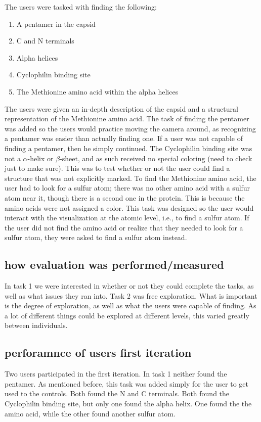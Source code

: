 \documentclass[review,journal]{vgtc}         %
\begin{document}
The users were tasked with finding the following:

\begin{enumerate}
	\item A pentamer in the capsid
	\item C and N terminals
	\item Alpha helices
	\item Cyclophilin binding site
	\item The Methionine amino acid within the alpha helices 
\end{enumerate}

The users were given an in-depth description of the capsid and a structural representation of the Methionine amino acid. The task of finding the pentamer was added so the users would practice moving the camera around, as recognizing a pentamer was easier than actually finding one.  If a user was not capable of finding a pentamer, then he simply continued. 
The Cyclophilin binding site was not a $\alpha$-helix or $\beta$-sheet, and as such received no special coloring (need to check just to make sure). This was to test whether or not the user could find a structure that was not explicitly marked. To find the Methionine amino acid, the user had to look for a sulfur atom; there was no other amino acid with a sulfur atom near it, though there is a second one in the protein. This is because the amino acids were not assigned a color. This task was designed so the user would interact with the visualization at the atomic level, i.e., to find a sulfur atom. If the user did not find the amino acid or realize that they needed to look for a sulfur atom, they were asked to find a sulfur atom instead.





\subsection{how evaluation was performed/measured}
In task 1 we were interested in whether or not they could complete the tasks, as well as what issues they ran into. Task 2 was free exploration. What is important is the degree of exploration, as well as what the users were capable of finding. As a lot of different things could be explored at different levels, this varied greatly between individuals.


\subsection{perforamnce of users first iteration}
Two users participated in the first iteration. In task 1 neither found the pentamer. As mentioned before, this task was added simply for the user to get used to the controls. Both found the N and C terminals. Both found the Cyclophilin binding site, but only one found the alpha helix. One found the the amino acid, while the other found another sulfur atom.
\end{document}
